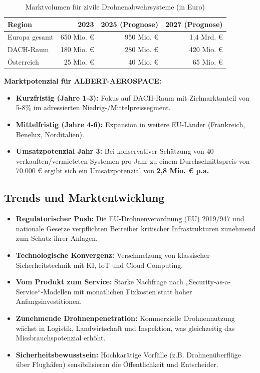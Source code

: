\documentclass[11pt,a4paper]{article}
\begin{document}
\begin{table}[ht]
\centering
\begin{tabularx}{0.9\textwidth}{lrrr}
\toprule
\textbf{Region} & \textbf{2023} & \textbf{2025 (Prognose)} & \textbf{2027 (Prognose)} \\
\midrule
Europa gesamt & 650 Mio. € & 950 Mio. € & 1,4 Mrd. € \\
DACH-Raum & 180 Mio. € & 280 Mio. € & 420 Mio. € \\
Österreich & 25 Mio. € & 40 Mio. € & 65 Mio. € \\
\bottomrule
\end{tabularx}
\caption{Marktvolumen für zivile Drohnenabwehrsysteme (in Euro)}
\end{table}

\vspace{0.5cm}

\textbf{Marktpotenzial für ALBERT-AEROSPACE:}
\begin{itemize}
    \item \textbf{Kurzfristig (Jahre 1-3):} Fokus auf DACH-Raum mit Zielmarktanteil von 5-8\% im adressierten Niedrig-/Mittelpreissegment.
    \item \textbf{Mittelfristig (Jahre 4-6):} Expansion in weitere EU-Länder (Frankreich, Benelux, Norditalien).
    \item \textbf{Umsatzpotenzial Jahr 3:} Bei konservativer Schätzung von 40 verkauften/vermieteten Systemen pro Jahr zu einem Durchschnittspreis von 70.000 € ergibt sich ein Umsatzpotenzial von \textbf{2,8 Mio. € p.a.}
\end{itemize}

\subsection{Trends und Marktentwicklung}
\begin{itemize}
    \item \textbf{Regulatorischer Push:} Die EU-Drohnenverordnung (EU) 2019/947 und nationale Gesetze verpflichten Betreiber kritischer Infrastrukturen zunehmend zum Schutz ihrer Anlagen.
    \item \textbf{Technologische Konvergenz:} Verschmelzung von klassischer Sicherheitstechnik mit KI, IoT und Cloud Computing.
    \item \textbf{Vom Produkt zum Service:} Starke Nachfrage nach „Security-as-a-Service“-Modellen mit monatlichen Fixkosten statt hoher Anfangsinvestitionen.
    \item \textbf{Zunehmende Drohnenpenetration:} Kommerzielle Drohnennutzung wächst in Logistik, Landwirtschaft und Inspektion, was gleichzeitig das Missbrauchspotenzial erhöht.
    \item \textbf{Sicherheitsbewusstsein:} Hochkarätige Vorfälle (z.B. Drohnenüberflüge über Flughäfen) sensibilisieren die Öffentlichkeit und Entscheider.
\end{itemize}
\end{document}
